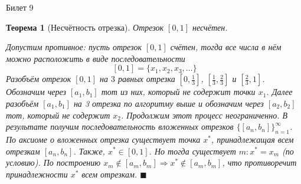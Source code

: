 \documentclass[12pt,a4paper]{article}
\newtheorem*{theorem*}{Теорема}
\begin{document}
\begin{center}
Билет 9
\end{center}

\begin{theorem*}[Несчётность отрезка]
\label{9.1}
Отрезок $[0, 1]$ несчётен.

Допустим противное: пусть отрезок $[0, 1]$ счётен, тогда все числа в нём можно расположить в виде последовательности
$$
[0, 1] = \{ x_1, x_2, x_3, \ldots \}
$$
Разобъём отрезок $[0, 1]$ на $3$ равных отрезка $[0, \frac{1}{3}]$, $[\frac{1}{3}, \frac{2}{3}]$ и $[\frac{2}{3}, 1]$. Обозначим через $[a_1, b_1]$ тот из них, который не содержит точки $x_1$. Далее разобъём $[a_1, b_1]$ на 3 отрезка по алгоритму выше и обозначим через $[a_2, b_2]$ тот, который не содержит $x_2$. Продолжим этот процесс неограниченно. В результате получим последовательность вложенных отрезков $\{ [a_n, b_n] \}_{n=1}^{\infty}$. По аксиоме о вложенных отрезка существует точка $x^{*}$, принадлежащая всем отрезкам $[a_n, b_n]$. Также, $x^{*} \in [0, 1]$. Но тогда существует $m: x^{*}=x_m$ (по условию). По построению $x_m \not\in [a_m, b_m] \Rightarrow x^{*} \not\in [a_m, b_m]$, что противоречит принадлежности $x^{*}$ всем отрезкам. $\blacksquare$
\end{theorem*}
\end{document}
